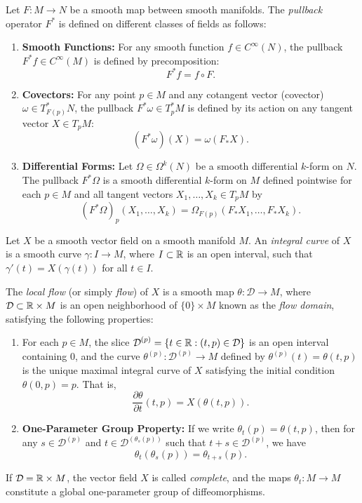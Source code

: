 \begin{definition}[Pullback]\label{def:pullback}
	Let $F: M \to N$ be a smooth map between smooth manifolds. The \textit{pullback} operator $F^*$ is defined on different classes of fields as follows:
	\begin{enumerate}
		\item \textbf{Smooth Functions:} For any smooth function $f \in C^\infty(N)$, the pullback $F^*f \in C^\infty(M)$ is defined by precomposition:
		\[
		F^*f = f \circ F.
		\]
		
		\item \textbf{Covectors:} For any point $p \in M$ and any cotangent vector (covector) $\omega \in T_{F(p)}^*N$, the pullback $F^*\omega \in T_p^*M$ is defined by its action on any tangent vector $X \in T_pM$:
		\[
		(F^*\omega)(X) = \omega(F_*X).
		\]
		
		\item \textbf{Differential Forms:} Let $\Omega \in \mathcal{\Omega}^k(N)$ be a smooth differential $k$-form on $N$. The pullback $F^*\Omega$ is a smooth differential $k$-form on $M$ defined pointwise for each $p \in M$ and all tangent vectors $X_1, \dots, X_k \in T_pM$ by
		\[
		(F^*\Omega)_p(X_1, \dots, X_k) = \Omega_{F(p)}(F_*X_1, \dots, F_*X_k).
		\]
	\end{enumerate}
\end{definition}

\begin{definition}\label{def:flow}
	Let $X$ be a smooth vector field on a smooth manifold $M$. An \textit{integral curve} of $X$ is a smooth curve $\gamma: I \to M$, where $I \subset \mathbb{R}$ is an open interval, such that $\gamma'(t) = X(\gamma(t))$ for all $t \in I$.
	
	The \textit{local flow} (or simply \textit{flow}) of $X$ is a smooth map $\theta: \mathcal{D} \to M$, where $\mathcal{D} \subset \R \times M$ is an open neighborhood of $\{0\} \times M$ known as the \textit{flow domain}, satisfying the following properties:
	\begin{enumerate}
		\item For each $p \in M$, the slice $\mathcal{D}^{(p)} = \{t \in \R : (t, p) \in \mathcal{D}\}$ is an open interval containing $0$, and the curve $\theta^{(p)}: \mathcal{D}^{(p)} \to M$ defined by $\theta^{(p)}(t) = \theta(t, p)$ is the unique maximal integral curve of $X$ satisfying the initial condition $\theta(0, p) = p$. That is,
		\[
		\frac{\partial \theta}{\partial t}(t, p) = X(\theta(t, p)).
		\]
		\item \textbf{One-Parameter Group Property:} If we write $\theta_t(p) = \theta(t, p)$, then for any $s \in \mathcal{D}^{(p)}$ and $t \in \mathcal{D}^{(\theta_s(p))}$ such that $t+s \in \mathcal{D}^{(p)}$, we have
		\[
		\theta_t(\theta_s(p)) = \theta_{t+s}(p).
		\]
	\end{enumerate}
	If $\mathcal{D} = \R \times M$, the vector field $X$ is called \textit{complete}, and the maps $\theta_t: M \to M$ constitute a global one-parameter group of diffeomorphisms.
\end{definition}

